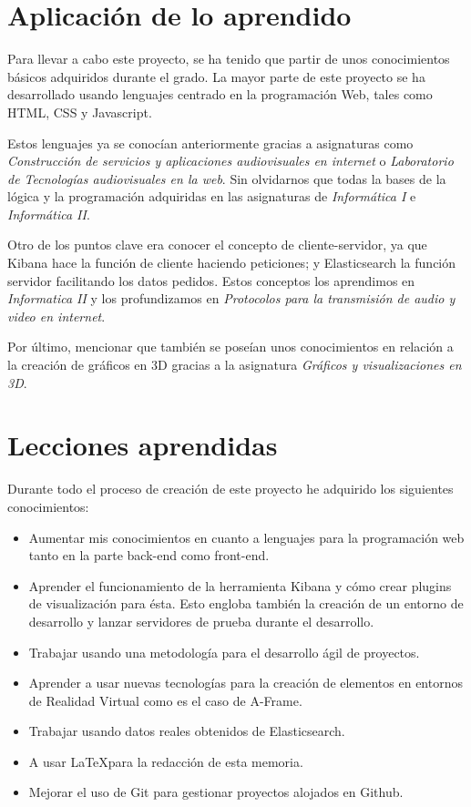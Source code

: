 \documentclass[a4paper, 12pt]{book}
\begin{document}
\section{Aplicación de lo aprendido}
\label{sec:aprendido}

Para llevar a cabo este proyecto, se ha tenido que partir de unos conocimientos básicos adquiridos durante el grado. La mayor parte de este proyecto se ha desarrollado usando lenguajes centrado en la programación Web, tales como HTML, CSS y Javascript. 

Estos lenguajes ya se conocían anteriormente gracias a asignaturas como \textit{Construcción de servicios y aplicaciones audiovisuales en internet} o \textit{Laboratorio de Tecnologías audiovisuales en la web}. Sin olvidarnos que todas la bases de la lógica y la programación adquiridas en las asignaturas de \textit{Informática I} e \textit{Informática II}. 

Otro de los puntos clave era conocer el concepto de cliente-servidor, ya que Kibana hace la función de cliente haciendo peticiones; y Elasticsearch la función servidor facilitando los datos pedidos. Estos conceptos los aprendimos en \textit{Informatica II} y los profundizamos en \textit{Protocolos para la transmisión de audio y video en internet}. 

Por último, mencionar que también se poseían unos conocimientos en relación a la creación de gráficos en 3D gracias a la asignatura \textit{Gráficos y visualizaciones en 3D}.

\section{Lecciones aprendidas}
\label{sec:lecciones}

Durante todo el proceso de creación de este proyecto he adquirido los siguientes conocimientos:

\begin{itemize}
    \item Aumentar mis conocimientos en cuanto a lenguajes para la programación web tanto en la parte back-end como front-end.
    \item Aprender el funcionamiento de la herramienta Kibana y cómo crear plugins de visualización para ésta. Esto engloba también la creación de un entorno de desarrollo y lanzar servidores de prueba durante el desarrollo.
    \item Trabajar usando una metodología para el desarrollo ágil de proyectos.
    \item Aprender a usar nuevas tecnologías para la creación de elementos en entornos de Realidad Virtual como es el caso de A-Frame.
    \item Trabajar usando datos reales obtenidos de Elasticsearch.
    \item A usar \LaTeX  para la redacción de esta memoria. 
    \item Mejorar el uso de Git para gestionar proyectos alojados en Github.
\end{itemize}
\end{document}
